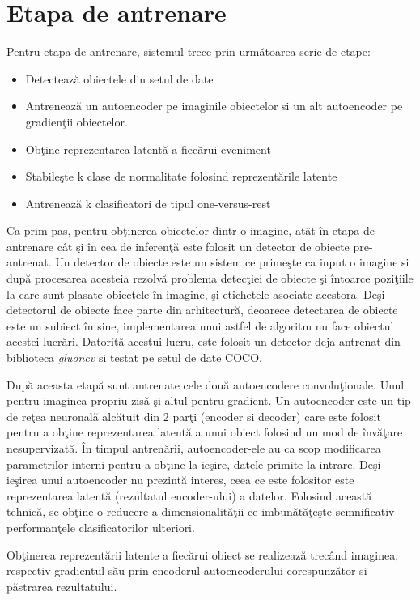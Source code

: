 \documentclass[a4paper,12pt]{report}
\begin{document}
\section{Etapa de antrenare}
Pentru etapa de antrenare, sistemul trece prin următoarea serie de etape: 
\begin{itemize}
\item Detectează obiectele din setul de date
\item Antrenează un autoencoder pe imaginile obiectelor si un alt autoencoder pe gradienţii obiectelor.
\item Obţine reprezentarea latentă a fiecărui eveniment
\item Stabileşte k clase de normalitate folosind reprezentările latente
\item Antrenează k clasificatori de tipul one-versus-rest
\end{itemize}
\par Ca prim pas, pentru obţinerea obiectelor dintr-o imagine, atât în etapa de antrenare cât şi în cea de inferenţă este folosit un detector de obiecte pre-antrenat. Un detector de obiecte este un sistem ce primeşte ca input o imagine si după procesarea acesteia rezolvă problema detecţiei de obiecte şi întoarce poziţiile la care sunt plasate obiectele în imagine, şi etichetele asociate acestora. Deşi detectorul de obiecte face parte din arhitectură, deoarece detectarea de obiecte este un subiect în sine, implementarea unui astfel de algoritm nu face obiectul acestei lucrări. Datorită acestui lucru, este folosit un detector deja antrenat din biblioteca \emph{gluoncv} si testat pe setul de date COCO. 
\par După aceasta etapă sunt antrenate cele două autoencodere convoluţionale. Unul pentru imaginea propriu-zisă şi altul pentru gradient. Un autoencoder este un tip de reţea neuronală alcătuit din 2 parţi (encoder si decoder) care este folosit pentru a obţine reprezentarea latentă a unui obiect folosind un mod de învăţare nesupervizată. În timpul antrenării, autoencoder-ele au ca scop modificarea parametrilor interni pentru a obţine la ieşire, datele primite la intrare. Deşi ieşirea unui autoencoder nu prezintă interes, ceea ce este folositor este reprezentarea latentă (rezultatul encoder-ului) a datelor. Folosind această tehnică, se obţine o reducere a dimensionalităţii ce imbunătăţeşte semnificativ performanţele clasificatorilor ulteriori. 
\par Obţinerea reprezentării latente a fiecărui obiect se realizează trecând imaginea, respectiv gradientul său prin encoderul autoencoderului corespunzător si păstrarea rezultatului.
\end{document}
